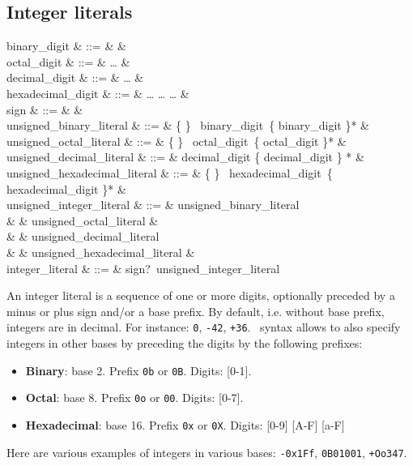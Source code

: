 \subsection{Integer literals}
\label{integer literals}
\label{octal}
\label{hexadecimal}
\label{binary}
\begin{syntax}
binary\_digit & ::= &  \mid {} & \\
octal\_digit & ::= &  \ldots {} & \\
decimal\_digit & ::= &  \ldots {} & \\
hexadecimal\_digit & ::= &  \ldots {}
       \mid {} \ldots {}
       \mid {} \ldots {} & \\
sign & ::= & \terminal{+} \mid \terminal{-} & \\
unsigned\_binary\_literal & ::= &
   \{  \mid {} \}
  \ binary\_digit\ \{ binary\_digit \mid \terminal{\_} \}* & \\
unsigned\_octal\_literal & ::= &
   \{  \mid {} \}
  \ octal\_digit\ \{ octal\_digit \mid \terminal{\_} \}* & \\
unsigned\_decimal\_literal & ::= &
  decimal\_digit \{ decimal\_digit \mid \terminal{\_} \} * & \\
unsigned\_hexadecimal\_literal & ::= &
   \{  \mid {} \}
  \ hexadecimal\_digit\ \{ hexadecimal\_digit \mid \terminal{\_} \}* & \\
unsigned\_integer_literal & ::= & unsigned\_binary\_literal \\
& & \mid unsigned\_octal\_literal & \\
& & \mid unsigned\_decimal\_literal \\
& & \mid unsigned\_hexadecimal\_literal & \\
integer\_literal & ::= & sign?\ unsigned\_integer\_literal
\end{syntax}

An integer literal is a sequence of one or more digits, optionally
preceded by a minus or plus sign and/or a base prefix. By default,
i.e. without base prefix, integers are in decimal. For instance:
{\tt 0}, {\tt -42}, {\tt +36}. \focal\ syntax allows to also specify
integers in other bases by preceding the digits by the following
prefixes:
\begin{itemize}
  \item {\bf Binary}: base 2. Prefix {\tt 0b} or {\tt 0B}.
    Digits: [0-1].
  \item {\bf Octal}: base 8. Prefix {\tt 0o} or {\tt 00}.
    Digits: [0-7].
  \item {\bf Hexadecimal}: base 16. Prefix {\tt 0x} or {\tt 0X}.
    Digits: [0-9] [A-F] [a-F]
\end{itemize}
Here are various examples of integers in various bases:
{\tt -0x1Ff}, {\tt 0B01001}, {\tt +Oo347}.



